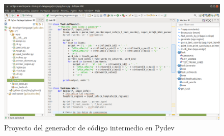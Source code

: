 \begin{figure}[hp!]
    \centering
    \includegraphics[angle=90,height=1.6\textwidth]{imaxes/z-adicional/tool-gen-language-pydev.png}
    \caption{Proyecto del generador de código intermedio en Pydev}
    \label{fig:tool-gen-language-pydev}
\end{figure}


